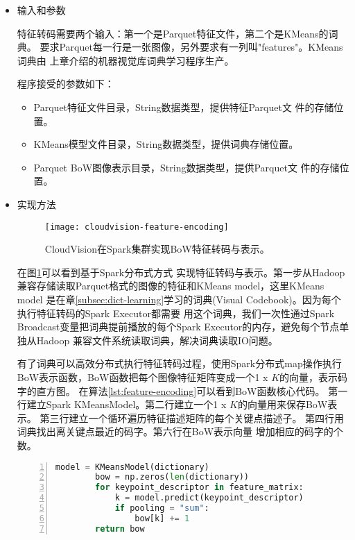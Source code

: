 \begin{itemize}
  \item 输入和参数 

        特征转码需要两个输入：第一个是Parquet特征文件，第二个是KMeans的词典。
        要求Parquet每一行是一张图像，另外要求有一列叫"features"。KMeans词典由
        上章介绍的机器视觉库词典学习程序生产。

        程序接受的参数如下：
        \begin{itemize}
          \item Parquet特征文件目录，String数据类型，提供特征Parquet文
                件的存储位置。
          \item KMeans模型文件目录，String数据类型，提供词典存储位置。
          \item Parquet BoW图像表示目录，String数据类型，提供Parquet文
                件的存储位置。
        \end{itemize}
  \item 实现方法

       \begin{figure}[h]
          \centering
            \texttt{[image: cloudvision-feature-encoding]}
          \caption{CloudVision在Spark集群实现BoW特征转码与表示。}
          \label{fig:cloudvision-feature-encoding}
        \end{figure}
        在图\ref{fig:cloudvision-feature-encoding}可以看到基于Spark分布式方式
        实现特征转码与表示。第一步从Hadoop兼容存储读取Parquet格式的图像的特征和KMeans model，这里KMeans model
        是在章\ref{subsec:dict-learning}学习的词典(Visual Codebook)。因为每个执行特征转码的Spark Executor都需要
        用这个词典，我们一次性通过Spark Broadcast变量把词典提前播放的每个Spark Executor的内存，避免每个节点单独从Hadoop
        兼容文件系统读取词典，解决词典读取IO问题。\cite{spark-programming-guide}

        有了词典可以高效分布式执行特征转码过程，使用Spark分布式map操作执行
        BoW表示函数，BoW函数把每个图像特征矩阵变成一个1 x $K$的向量，表示码字的直方图。
        在算法\ref{lst:feature-encoding}可以看到BoW函数核心代码。
        第一行建立Spark KMeansModel。第二行建立一个1 x $K$的向量用来保存BoW表示。
        第三行建立一个循环遍历特征描述矩阵的每个关键点描述子。
        第四行用词典找出离关键点最近的码字。第六行在BoW表示向量
        增加相应的码字的个数。
        \begin{minipage}{\textwidth}
        \begin{lstlisting}[language=Python,
                           basicstyle=\small,
                           numbers=left,
                           showstringspaces=false,
                           caption={BoW特征转码核心代码},
                           label={lst:feature-encoding}]
        model = KMeansModel(dictionary)
        bow = np.zeros(len(dictionary))
        for keypoint_descriptor in feature_matrix:
            k = model.predict(keypoint_descriptor)
            if pooling = "sum":
                bow[k] += 1
        return bow
        \end{lstlisting}
        \end{minipage}


\end{itemize}
